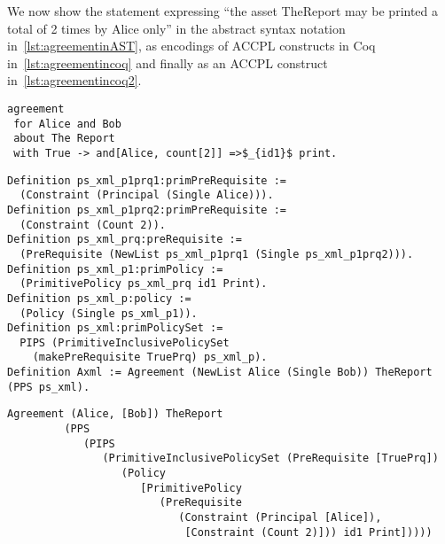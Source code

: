 \documentclass[runningheads,a4paper]{llncs}
\begin{document}
We now show the statement expressing ``the asset TheReport may be printed a total of 2 times by Alice only'' in the abstract syntax notation in~\ref{lst:agreementinAST}, as encodings of \ac{ACCPL} constructs in Coq in~\ref{lst:agreementincoq} and finally as an \ac{ACCPL} construct in~\ref{lst:agreementincoq2}.

\lstset{language=Pucella2006}
\begin{lstlisting}[frame=single, caption={First Agreement for Alice and Bob}, label={lst:agreementinAST}, mathescape]
agreement
 for Alice and Bob
 about The Report
 with True -> and[Alice, count[2]] =>$_{id1}$ print.
\end{lstlisting}

\begin{minipage}[c]{0.95\textwidth}
\begin{lstlisting}
Definition ps_xml_p1prq1:primPreRequisite := 
  (Constraint (Principal (Single Alice))).
Definition ps_xml_p1prq2:primPreRequisite := 
  (Constraint (Count 2)).
Definition ps_xml_prq:preRequisite := 
  (PreRequisite (NewList ps_xml_p1prq1 (Single ps_xml_p1prq2))).
Definition ps_xml_p1:primPolicy := 
  (PrimitivePolicy ps_xml_prq id1 Print).
Definition ps_xml_p:policy := 
  (Policy (Single ps_xml_p1)).
Definition ps_xml:primPolicySet :=
  PIPS (PrimitiveInclusivePolicySet
    (makePreRequisite TruePrq) ps_xml_p).
Definition Axml := Agreement (NewList Alice (Single Bob)) TheReport (PPS ps_xml).
\end{lstlisting}
\end{minipage} 

\begin{minipage}[c]{0.95\textwidth}
\begin{lstlisting}
Agreement (Alice, [Bob]) TheReport
         (PPS
            (PIPS
               (PrimitiveInclusivePolicySet (PreRequisite [TruePrq])
                  (Policy
                     [PrimitivePolicy
                        (PreRequisite
                           (Constraint (Principal [Alice]),
                            [Constraint (Count 2)])) id1 Print]))))

\end{lstlisting}
\end{minipage} 
\end{document}
